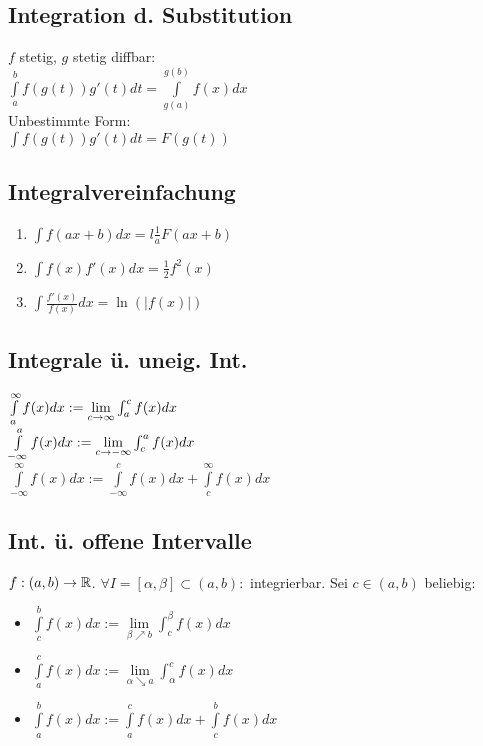 \subsection*{Integration d. Substitution}
$f$ stetig, $g$ stetig diffbar:\\
$\int\limits_a ^b f(g(t)) g'(t) dt = \int\limits_{g(a)}^{g(b)} f(x) dx$\\
Unbestimmte Form:\\
$\int f(g(t)) g'(t) dt = F(g(t))$
\subsection*{Integralvereinfachung}
\begin{enumerate}[label=\alph*., noitemsep]
    \item $\int f(ax + b) dx = l\frac{1}{a} F(ax + b)$
    \item $\int f(x) f'(x) dx = \frac{1}{2} f^2(x)$
    \item $\int \frac{f'(x)}{f(x)} dx = \ln (|f(x)|)$
\end{enumerate}
\subsection*{Integrale ü. uneig. Int.}
$\int\limits_a^\infty f(x) dx := \lim\limits_{c \rightarrow \infty} \int_a^c f(x) dx$\\
$\int\limits_{- \infty}^a f(x) dx := \lim\limits_{c \rightarrow - \infty} \int_c^a f(x) dx$\\
$\int\limits_{-\infty}^\infty f(x) dx := \int\limits_{-\infty}^c f(x) dx + \int\limits_c^\infty f(x) dx$
\subsection*{Int. ü. offene Intervalle}
$f:(a, b) \rightarrow \mathbb R$. $\forall I = [\alpha, \beta]\subset(a, b):$ integrierbar. Sei $c \in (a, b)$ beliebig:
\begin{itemize}[noitemsep]
    \item $\int\limits_c^b f(x) dx := \lim\limits_{\beta \nearrow b} \int_c^\beta f(x) dx$
    \item $\int\limits_a^c f(x) dx := \lim\limits_{\alpha \searrow a} \int_\alpha^c f(x) dx$
    \item $\int\limits_a^b f(x) dx := \int\limits_a^c f(x) dx + \int\limits_c^b f(x) dx$
\end{itemize}
